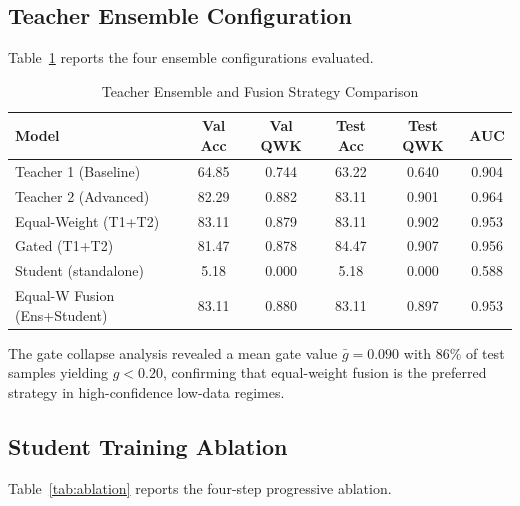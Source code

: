 \documentclass[10pt, twocolumn]{article}
\begin{document}
\subsection{Teacher Ensemble Configuration}
\label{sec:teacher_ensemble}

Table~\ref{tab:ensemble} reports the four ensemble configurations evaluated.

\begin{table}[h]
\centering
\caption{Teacher Ensemble and Fusion Strategy Comparison}
\label{tab:ensemble}
\small
\begin{tabular}{lccccc}
\toprule
\textbf{Model} & \textbf{Val Acc} & \textbf{Val QWK} & \textbf{Test Acc} & \textbf{Test QWK} & \textbf{AUC} \\
\midrule
Teacher 1 (Baseline) & 64.85 & 0.744 & 63.22 & 0.640 & 0.904 \\
Teacher 2 (Advanced) & 82.29 & 0.882 & 83.11 & 0.901 & 0.964 \\
Equal-Weight (T1+T2) & 83.11 & 0.879 & 83.11 & 0.902 & 0.953 \\
Gated (T1+T2) & 81.47 & 0.878 & 84.47 & 0.907 & 0.956 \\
Student (standalone) & 5.18 & 0.000 & 5.18 & 0.000 & 0.588 \\
Equal-W Fusion (Ens+Student) & 83.11 & 0.880 & 83.11 & 0.897 & 0.953 \\
\bottomrule
\end{tabular}
\end{table}

The gate collapse analysis revealed a mean gate value $\bar{g} = 0.090$ with 86\%
of test samples yielding $g < 0.20$, confirming that equal-weight fusion is the
preferred strategy in high-confidence low-data regimes.

\subsection{Student Training Ablation}
\label{sec:ablation}

Table~\ref{tab:ablation} reports the four-step progressive ablation.
\end{document}
